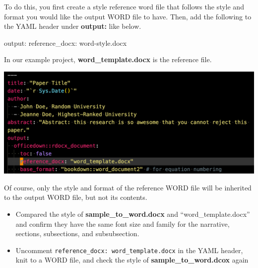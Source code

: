 \documentclass[
  letterpaper,
  DIV=11,
  numbers=noendperiod]{scrreprt}
\newenvironment{Shaded}{\begin{snugshade}}{\end{snugshade}}
\newcommand{\AnnotationTok}[1]{\textcolor[rgb]{0.37,0.37,0.37}{#1}}
\newcommand{\NormalTok}[1]{\textcolor[rgb]{0.00,0.23,0.31}{#1}}
\providecommand{\tightlist}{%
  \setlength{\itemsep}{0pt}\setlength{\parskip}{0pt}}\usepackage{longtable,booktabs,array}
\begin{document}
To do this, you first create a style reference word file that follows
the style and format you would like the output WORD file to have. Then,
add the following to the YAML header under \textbf{output:} like below.

\begin{Shaded}
\begin{Highlighting}[]
\AnnotationTok{output:}
\NormalTok{  reference\_docx: word{-}style.docx}
\end{Highlighting}
\end{Shaded}

In our example project, \textbf{word\_template.docx} is the reference
file.

\includegraphics[width=1\textwidth,height=\textheight]{assets/pictures/yaml-reference-docx.png}

Of course, only the style and format of the reference WORD file will be
inherited to the output WORD file, but not its contents.

\begin{tcolorbox}[enhanced jigsaw, colframe=quarto-callout-note-color-frame, toptitle=1mm, colbacktitle=quarto-callout-note-color!10!white, toprule=.15mm, colback=white, arc=.35mm, bottomtitle=1mm, opacitybacktitle=0.6, breakable, left=2mm, coltitle=black, leftrule=.75mm, title=\textcolor{quarto-callout-note-color}{\faInfo}\hspace{0.5em}{Note}, rightrule=.15mm, titlerule=0mm, opacityback=0, bottomrule=.15mm]

\begin{itemize}
\tightlist
\item
  Compared the style of \textbf{sample\_to\_word.docx} and
  ``word\_template.docx'' and confirm they have the same font size and
  family for the narrative, sections, subsections, and subsubsection.
\item
  Uncomment \texttt{reference\_docx:\ word\_template.docx} in the YAML
  header, knit to a WORD file, and check the style of
  \textbf{sample\_to\_word.dcox} again
\end{itemize}

\end{tcolorbox}
\end{document}
